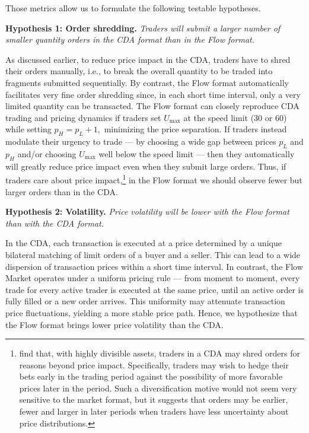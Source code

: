 \documentclass[12pt]{article}
\begin{document}
Those metrics allow us to formulate the following testable hypotheses. 

\noindent \textbf{Hypothesis 1: Order shredding.} \textit{Traders will submit a larger number of smaller quantity orders in the CDA format than in the Flow format.} 

\noindent As discussed earlier, to reduce price impact in the CDA, traders have to shred their orders manually, i.e., to break the overall quantity to be traded into fragments submitted sequentially. By contrast, the Flow format automatically facilitates very fine order shredding since, in each short time interval, only a very limited quantity can be transacted. 
The Flow format can closely reproduce CDA trading and pricing dynamics if traders set $U_{\text{max}}$ at the speed limit (30 or 60) while setting $p_H= p_L+1,$ minimizing the price separation. 
If traders instead modulate their urgency to trade --- by choosing a wide gap between prices $p_L$ and $p_H$  and/or choosing $U_{\text{max}}$ well below the speed limit --- then they automatically will greatly reduce price impact even when they submit large orders. Thus, if traders care about price impact,\footnote{\cite{elenaetal} find that, with highly divisible assets, traders in a CDA may shred orders for reasons beyond price impact. 
Specifically, traders may wish to hedge their bets early in the trading period against the possibility of more favorable prices later in the period. Such a diversification motive would not seem very sensitive to the market format, but it suggests that orders may be earlier, fewer and larger in later periods when traders have less uncertainty about price distributions.} 
in the Flow format we should observe fewer but larger orders than in the CDA. 

\vspace{0.3cm}
\noindent \textbf{Hypothesis 2: Volatility.} \textit{Price volatility will be lower with the Flow format than with the CDA format.}

\noindent In the CDA, each transaction is executed at a price determined by a unique bilateral matching of limit orders of a buyer and a seller. This can lead to a wide dispersion of transaction prices within a short time interval. In contrast, the Flow Market operates under a uniform pricing rule — from moment to moment, every trade for every active trader is executed at the same price, until an active order is fully filled or a new order arrives. This uniformity may attenuate transaction price fluctuations, yielding a more stable price path. Hence, we hypothesize that the Flow format brings lower price volatility than the CDA. 
\end{document}
